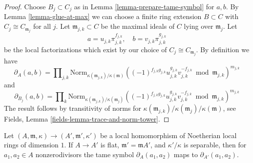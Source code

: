 \begin{proof}
Choose $B_j \subset C_j$ as in
Lemma \ref{lemma-prepare-tame-symbol} for $a, b$.
By Lemma \ref{lemma-glue-at-max} we can choose a finite ring
extension $B \subset C$ with $C_j \cong C_{\mathfrak m_j}$ for all $j$.
Let $\mathfrak m_{j, k} \subset C$ be the maximal ideals of $C$
lying over $\mathfrak m_j$. Let
$$
a = u_{j, k}\pi_{j, k}^{f_{j, k}},\quad
b = v_{j, k}\pi_{j, k}^{g_{j, k}}
$$
be the local factorizations which exist by our choice of
$C_j \cong C_{\mathfrak m_j}$. By definition we have
$$
\partial_A(a, b) = 
\prod\nolimits_{j, k}
\text{Norm}_{\kappa(\mathfrak m_{j, k})/\kappa(\mathfrak m)}
((-1)^{f_{j, k}g_{j, k}}u_{j, k}^{g_{j, k}}v_{j, k}^{-f_{j, k}}
\bmod \mathfrak m_{j, k})^{m_{j, k}}
$$
and
$$
\partial_{B_j}(a, b) = 
\prod\nolimits_k
\text{Norm}_{\kappa(\mathfrak m_{j, k})/\kappa(\mathfrak m_j)}
((-1)^{f_{j, k}g_{j, k}}u_{j, k}^{g_{j, k}}v_{j, k}^{-f_{j, k}}
\bmod \mathfrak m_{j, k})^{m_{j, k}}
$$
The result follows by transitivity of norms
for $\kappa(\mathfrak m_{j, k})/\kappa(\mathfrak m_j)/\kappa(\mathfrak m)$, see
Fields, Lemma \ref{fields-lemma-trace-and-norm-tower}.
\end{proof}

\begin{lemma}
\label{lemma-tame-symbol-formally-smooth}
Let $(A, \mathfrak m, \kappa) \to (A', \mathfrak m', \kappa')$
be a local homomorphism of Noetherian local rings of dimension $1$.
If $A \to A'$ is flat, $\mathfrak m' = \mathfrak m A'$, and $\kappa'/\kappa$
is separable, then for $a_1, a_2 \in A$ nonzerodivisors the tame symbol
$\partial_A(a_1, a_2)$ maps to $\partial_{A'}(a_1, a_2)$.
\end{lemma}

